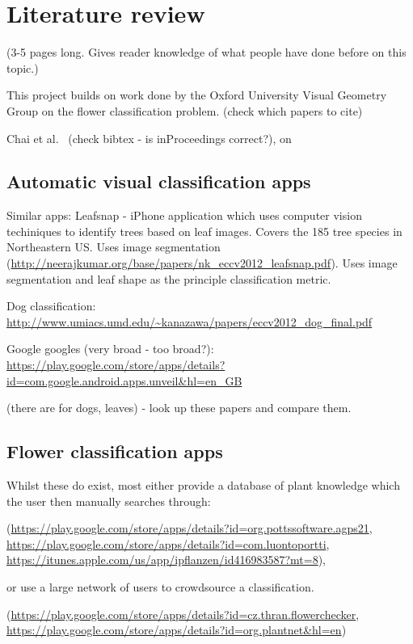 \documentclass[11pt, a4paper]{report}
\begin{document}
\chapter{Literature review}

(3-5 pages long. Gives reader knowledge of what people have done before on this topic.) 

This project builds on work done by the Oxford University Visual Geometry Group on the flower classification problem. (check which papers to cite)

Chai et al.~\cite{Chai11} (check bibtex - is inProceedings correct?), on 

\section{Automatic visual classification apps}

Similar apps:
Leafsnap - iPhone application which uses computer vision techiniques to identify trees based on leaf images. Covers the 185 tree species in Northeastern US. Uses image segmentation (\url{http://neerajkumar.org/base/papers/nk_eccv2012_leafsnap.pdf}). Uses image segmentation and leaf shape as the principle classification metric. 

Dog classification:
\url{http://www.umiacs.umd.edu/~kanazawa/papers/eccv2012_dog_final.pdf}

Google googles (very broad - too broad?):
\url{https://play.google.com/store/apps/details?id=com.google.android.apps.unveil&hl=en_GB}


 (there are for dogs, leaves) - look up these papers and compare them.

\section{Flower classification apps}
Whilst these do exist, most either provide a database of plant knowledge which the user then manually searches through:

(\url{https://play.google.com/store/apps/details?id=org.pottssoftware.agps21}, 
\url{https://play.google.com/store/apps/details?id=com.luontoportti}, 
\url{https://itunes.apple.com/us/app/ipflanzen/id416983587?mt=8}), 

or use a large network of users to crowdsource a classification. 

(\url{https://play.google.com/store/apps/details?id=cz.thran.flowerchecker}, \url{https://play.google.com/store/apps/details?id=org.plantnet&hl=en})
\end{document}

